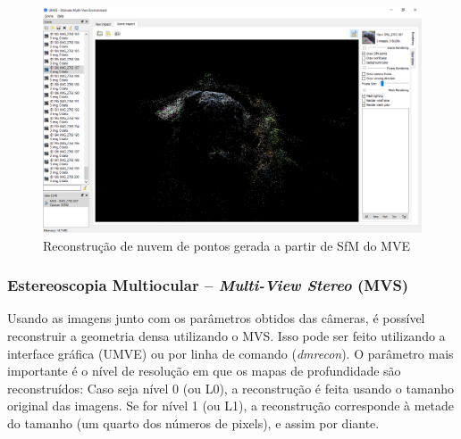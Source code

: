 \begin{figure}[!h]
	\centering
	\includegraphics[width=\linewidth]{figs/umve5sfm.png}
	\caption{%
  Reconstrução de nuvem de pontos gerada a partir de
  SfM do MVE%
	}\label{fig:mvesfm}
\end{figure}


%
\subsubsection*{Estereoscopia Multiocular -- \emph{Multi-View Stereo} (MVS)}

Usando as imagens junto com os parâmetros obtidos das câmeras, é possível
reconstruir a geometria densa utilizando o MVS. Isso pode ser feito utilizando a
interface gráfica (UMVE) ou por linha de comando (\emph{dmrecon}).
O parâmetro mais importante é o nível de resolução em que os mapas de
profundidade são reconstruídos: Caso seja nível 0 (ou L0), a reconstrução é
feita usando o tamanho original das imagens. Se for nível 1 (ou L1), a
reconstrução corresponde à metade do tamanho (um quarto dos números de pixels),
e assim por diante.

